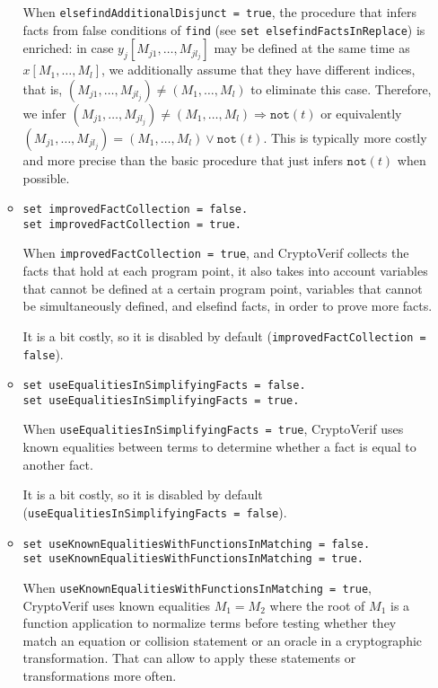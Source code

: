 \begin{itemize}
\begin{itemize}
When \texttt{elsefindAdditionalDisjunct = true}, the procedure that infers facts
from false conditions of \texttt{find} (see \texttt{set elsefindFactsInReplace})
is enriched: in case $y_j[M_{j1}, \ldots, M_{jl_j}]$ may be defined
at the same time as $x[M_1, \ldots, M_l]$, we additionally assume
that they have different indices, that is, $(M_{j1}, \ldots, M_{jl_j}) \neq (M_1, \ldots, M_l)$
to eliminate this case. Therefore, we infer 
$(M_{j1}, \ldots, M_{jl_j}) \neq (M_1, \ldots, M_l) \Rightarrow \texttt{not}(t)$
or equivalently $(M_{j1}, \ldots, M_{jl_j}) = (M_1, \ldots, M_l) \vee \texttt{not}(t)$.
This is typically more costly and more precise than the basic 
procedure that just infers $\texttt{not}(t)$ when possible.

\item \texttt{set improvedFactCollection = false.}\\
\texttt{set improvedFactCollection = true.}

When \texttt{improvedFactCollection = true}, and CryptoVerif collects
the facts that hold at each program point, it also takes into account
variables that cannot be defined at a certain program point, variables
that cannot be simultaneously defined, and elsefind facts, in order to
prove more facts.

It is a bit costly, so it is disabled by default
(\texttt{improvedFactCollection = false}).

\item \texttt{set useEqualitiesInSimplifyingFacts = false.}\\
\texttt{set useEqualitiesInSimplifyingFacts = true.}

When \texttt{useEqualitiesInSimplifyingFacts = true}, CryptoVerif
uses known equalities between terms to determine whether a fact
is equal to another fact.

It is a bit costly, so it is disabled by default
(\texttt{useEqualitiesInSimplifyingFacts = false}).

\item \texttt{set useKnownEqualitiesWithFunctionsInMatching = false.}\\
\texttt{set useKnownEqualitiesWithFunctionsInMatching = true.}

When \texttt{useKnownEqualitiesWithFunctionsInMatching = true}, CryptoVerif
uses known equalities $M_1 = M_2$ where the root of $M_1$ is a function 
application to normalize terms before testing whether they match
an equation or collision statement or an oracle in a cryptographic
transformation. That can allow to apply these statements or transformations
more often.


\end{itemize}
\end{itemize}
